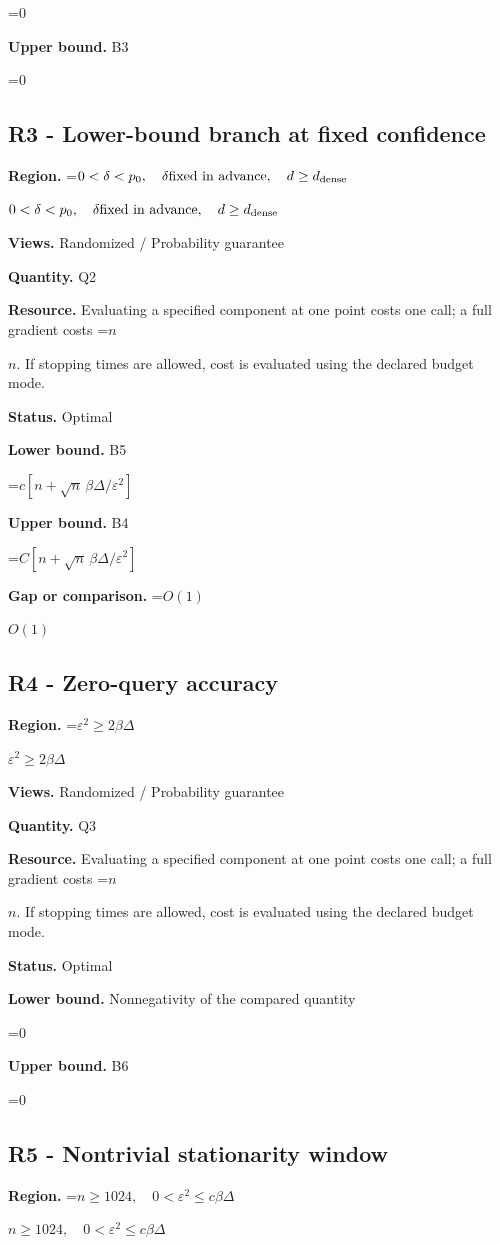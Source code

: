 \documentclass[10pt,a4paper]{article}
\newcommand{\AtlasMath}[1]{\par\begingroup\centering\setbox0=\hbox{$\displaystyle #1$}\ifdim\wd0>1.4\linewidth\typeout{ATLAS WIDE FORMULA: \the\wd0}\fi\ifdim\wd0>\linewidth\resizebox{\linewidth}{!}{\box0}\else\box0\fi\par\endgroup}
\newcommand{\AtlasInlineMath}[1]{\begingroup\setbox0=\hbox{$#1$}\ifdim\wd0>.4\linewidth\endgroup\AtlasMath{#1}\else\endgroup$#1$\fi}
\begin{document}
\AtlasMath{0}
\textbf{Upper bound.} B3

\AtlasMath{0}
\subsection{R3 - Lower-bound branch at fixed confidence}
\textbf{Region.} \AtlasInlineMath{0<\delta<p_0,\quad\delta\text{fixed in advance},\quad d\ge d_{\rm dense}}

\textbf{Views.} Randomized / Probability guarantee

\textbf{Quantity.} Q2

\textbf{Resource.} Evaluating a specified component at one point costs one call; a full gradient costs \AtlasInlineMath{n}. If stopping times are allowed, cost is evaluated using the declared budget mode.

\textbf{Status.} Optimal

\textbf{Lower bound.} B5

\AtlasMath{c[n+\sqrt n\,\beta\Delta/\varepsilon^2]}
\textbf{Upper bound.} B4

\AtlasMath{C[n+\sqrt n\,\beta\Delta/\varepsilon^2]}
\textbf{Gap or comparison.} \AtlasInlineMath{O(1)}

\subsection{R4 - Zero-query accuracy}
\textbf{Region.} \AtlasInlineMath{\varepsilon^2\ge2\beta\Delta}

\textbf{Views.} Randomized / Probability guarantee

\textbf{Quantity.} Q3

\textbf{Resource.} Evaluating a specified component at one point costs one call; a full gradient costs \AtlasInlineMath{n}. If stopping times are allowed, cost is evaluated using the declared budget mode.

\textbf{Status.} Optimal

\textbf{Lower bound.} Nonnegativity of the compared quantity

\AtlasMath{0}
\textbf{Upper bound.} B6

\AtlasMath{0}
\subsection{R5 - Nontrivial stationarity window}
\textbf{Region.} \AtlasInlineMath{n\ge1024,\quad0<\varepsilon^2\le c\beta\Delta}
\end{document}
